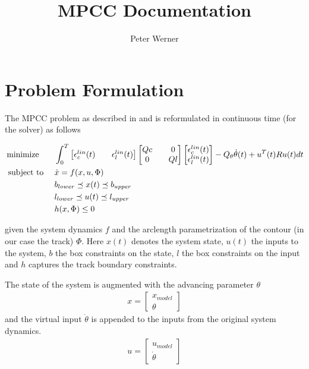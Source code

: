 \documentclass[12pt]{article}
\title{MPCC Documentation}
\author{Peter Werner}
\begin{document}
\maketitle

\section{Problem Formulation}

The MPCC problem as described in \cite{lam2010model} and \cite{liniger2015optimization} is reformulated in continuous time (for the solver) as follows

\begin{align}
\begin{aligned}
&\mathop{\text{minimize }} &&\int_{0}^{T}\begin{bmatrix}
\epsilon_c^{lin}(t)&&\epsilon_l^{lin}(t)
\end{bmatrix}
\begin{bmatrix}
Qc&&0\\0&&Ql
\end{bmatrix}
\begin{bmatrix}
\epsilon_c^{lin}(t)\\
\epsilon_l^{lin}(t)
\end{bmatrix} - Q_{\theta}\dot{\theta}(t) + u^T(t) R u(t)dt\\
&\text{ subject to }  &&\dot{x} = f(x,u,\Phi)\\
&&& b_{lower}\preceq x(t) \preceq b_{upper}\\
&&& l_{lower}\preceq u(t) \preceq l_{upper}\\
&&& h(x, \Phi) \leq 0
\end{aligned}
\end{align}

given the system dynamics $f$ and the arclength parametrization of the contour (in our case the track) $\Phi$. Here $x(t)$ denotes the system state, $u(t)$ the inputs to the system, $b$ the box constraints on the state, $l$ the box constraints on the input and $h$ captures the track boundary constraints.

The state of the system is augmented with the advancing parameter $\theta$ 
\begin{align}
x = \begin{bmatrix}
x_{model}\\
\theta
\end{bmatrix}
\end{align}
 and the virtual input $\dot\theta$ is appended to the inputs from the original system dynamics. 
\begin{align}
u = \begin{bmatrix}
u_{model}\\\dot\theta
\end{bmatrix}
\end{align}
\end{document}
